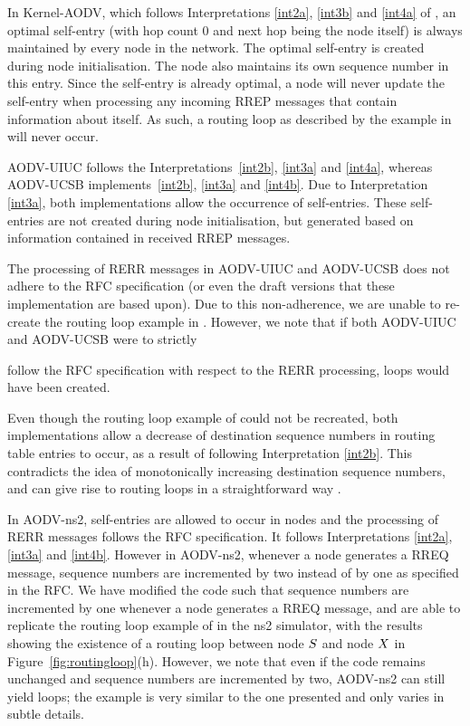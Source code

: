 \documentclass[letterpaper]{sig-alternate-pages}
\newcommand{\gennode}[1]{\ensuremath{\MakeUppercase{#1}}\xspace}
\newcommand{\ns}{\gennode{s}}
\newcommand{\nx}{\gennode{x}}
\newcommand{\rtes}{routing table entries\xspace}
\begin{document}
In Kernel-AODV, which follows Interpretations \ref{int2a}, \ref{int3b} and \ref{int4a} of , an optimal self-entry (with hop count 0 and next hop being the node itself) is always maintained by every node in the network. The optimal self-entry is created during node initialisation. 
The node also maintains its own sequence number in this entry.
Since the self-entry is already optimal, a node will never update the self-entry when processing any incoming RREP messages that contain information about itself. As such, a routing loop as described by the example in  will never occur.

AODV-UIUC follows the Interpretations~\ref{int2b}, \ref{int3a} and \ref{int4a},
whereas AODV-UCSB implements~\ref{int2b}, \ref{int3a} and \ref{int4b}.
Due to Interpretation \ref{int3a}, both implementations allow the occurrence of self-entries.
These self-entries are not created during node initialisation, but
generated based on information contained in received RREP messages.

The processing of RERR messages in AODV-UIUC and AODV-UCSB
does not adhere to the RFC specification (or even the draft versions that these implementation
are based upon).
Due to this non-adherence, we are unable to re-create the routing loop example in .
However, we note that if both AODV-UIUC and AODV-UCSB were to strictly\rule{0mm}{6.4mm} follow the RFC specification with respect to the RERR processing, loops would have been created.

Even though the routing loop example of  could not be recreated,
  both implementations allow a decrease of destination sequence numbers in \rtes to occur,
  as a result of following Interpretation \ref{int2b}. 
  This contradicts the idea
  of monotonically increasing destination sequence numbers, and can give rise to routing loops in a
  straightforward way \cite[Sect.~8.1]{TR11}.

In AODV-ns2, self-entries are allowed to
occur in nodes and the processing of RERR messages
follows the RFC specification. It follows Interpretations \ref{int2a}, \ref{int3a} and \ref{int4b}.
However in AODV-ns2, whenever a node generates a RREQ message,
sequence numbers are incremented by two instead of by one as specified in the RFC\@.  We have modified the
code such that sequence numbers are incremented by one whenever a node
generates a RREQ message, and are able to replicate the routing loop example
of  in the ns2 simulator, with the results
showing the existence of a routing loop between node \ns and node \nx
in Figure~\ref{fig:routingloop}(h). However, we note that even if the code
remains unchanged and sequence numbers are incremented by two, AODV-ns2 can still
yield loops; the example is very similar to the one presented and only
varies in subtle details.
\end{document}
